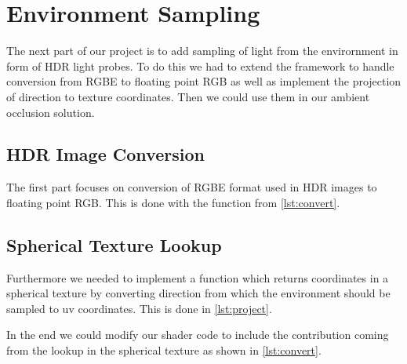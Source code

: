 \section{Environment Sampling}
The next part of our project is to add sampling of light from the envirornment in form of HDR light probes. To do this we had to extend the framework to handle conversion from RGBE to floating point RGB as well as implement the projection of direction to texture coordinates. Then we could use them in our ambient occlusion solution.

\subsection{HDR Image Conversion}
The first part focuses on conversion of RGBE format used in HDR images to floating point RGB. This is done with the function from \autoref{lst:convert}.



\subsection{Spherical Texture Lookup}
Furthermore we needed to implement a function which returns coordinates in a spherical texture by converting direction from which the environment should be sampled to uv coordinates. This is done in \autoref{lst:project}.



In the end we could modify our shader code to include the contribution coming from the lookup in the spherical texture as shown in \autoref{lst:convert}.

